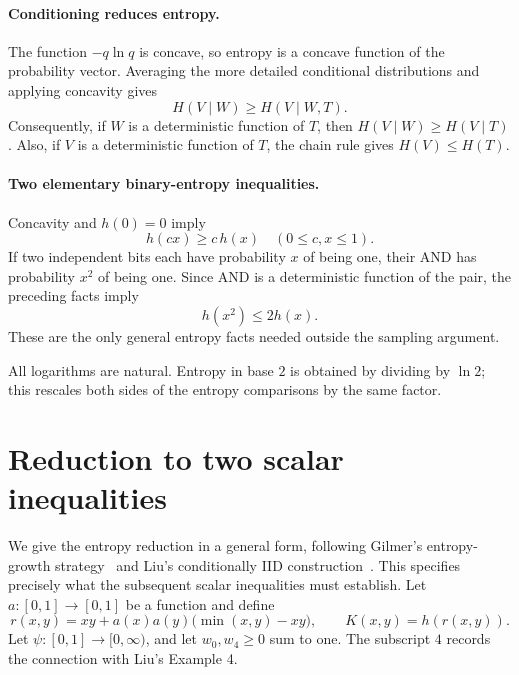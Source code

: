 \documentclass[11pt]{article}
\theoremstyle{remark}
\begin{document}
\paragraph{Conditioning reduces entropy.}
The function \(-q\ln q\) is concave, so entropy is a concave function
of the probability vector. Averaging the more detailed conditional
distributions and applying concavity gives
\[
H(V\mid W)\ge H(V\mid W,T).
\]
Consequently, if \(W\) is a deterministic function of \(T\),
then \(H(V\mid W)\ge H(V\mid T)\). Also,
if \(V\) is a deterministic function of \(T\), the chain rule gives
\(H(V)\le H(T)\).

\paragraph{Two elementary binary-entropy inequalities.}
Concavity and \(h(0)=0\) imply
\begin{equation}\label{eq:concavity-scaling}
h(cx)\ge c\,h(x)\quad(0\le c,x\le1).
\end{equation}
If two independent bits each have probability \(x\) of being one,
their AND has probability \(x^2\) of being one. Since AND is a
deterministic function of the pair, the preceding facts imply
\begin{equation}\label{eq:and}
h(x^2)\le2h(x).
\end{equation}
These are the only general entropy facts needed outside the sampling
argument.


All logarithms are natural. Entropy in base \(2\) is obtained by dividing
by \(\ln2\); this rescales both sides of the entropy comparisons by the
same factor.

\section{Reduction to two scalar inequalities}\label{sec:reduction}

We give the entropy reduction in a general form, following
Gilmer's entropy-growth strategy~\cite{gilmer} and Liu's conditionally
IID construction~\cite{liu}. This specifies precisely what the
subsequent scalar inequalities must establish.
Let \(a:[0,1]\to[0,1]\) be a function and define
\begin{equation}\label{eq:kernel-general}
r(x,y)=xy+a(x)a(y)\bigl(\min(x,y)-xy\bigr),\qquad
K(x,y)=h(r(x,y)).
\end{equation}
Let \(\psi:[0,1]\to[0,\infty)\), and let \(w_0,w_4\ge0\) sum to one.
The subscript \(4\) records the connection with Liu's Example 4.
\end{document}
